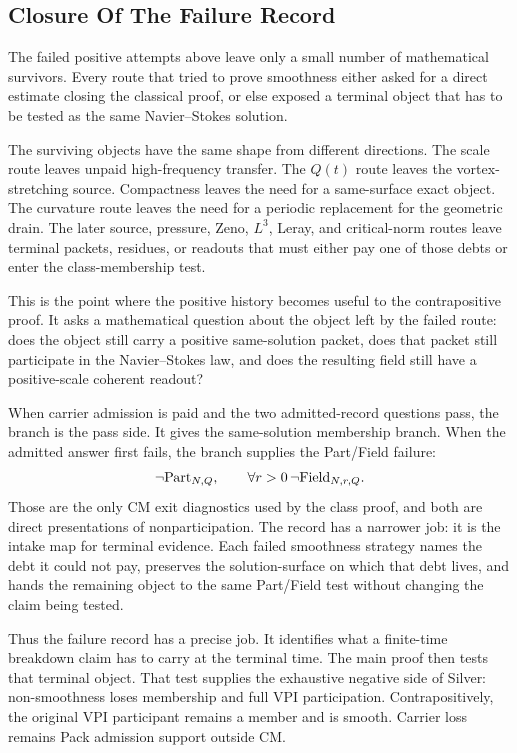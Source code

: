 \subsection{Closure Of The Failure Record}

The failed positive attempts above leave only a small number of mathematical
survivors.
Every route that tried to prove smoothness either asked for a direct estimate
closing the classical proof, or else exposed a terminal object that has to be
tested as the same Navier--Stokes solution.

The surviving objects have the same shape from different directions.
The scale route leaves unpaid high-frequency transfer.
The \(Q(t)\) route leaves the vortex-stretching source.
Compactness leaves the need for a same-surface exact object.
The curvature route leaves the need for a periodic replacement for the geometric
drain.
The later source, pressure, Zeno, \(L^3\), Leray, and critical-norm routes leave
terminal packets, residues, or readouts that must either pay one of those debts
or enter the class-membership test.

This is the point where the positive history becomes useful to the
contrapositive proof.
It asks a mathematical question about the object left by the failed route:
does the object still carry a positive same-solution packet, does that packet
still participate in the Navier--Stokes law, and does the resulting field still
have a positive-scale coherent readout?

When carrier admission is paid and the two admitted-record questions pass, the branch is the pass side.
It gives the same-solution membership branch.
When the admitted answer first fails, the branch supplies the Part/Field failure:
\[
  \neg\mathrm{Part}_{N,Q},
  \qquad
  \forall r>0\,\neg\mathrm{Field}_{N,r,Q}.
\]
Those are the only CM exit diagnostics used by the class proof, and both are
direct presentations of nonparticipation.
The record has a narrower job: it is the intake map for terminal evidence.
Each failed smoothness strategy
names the debt it could not pay, preserves the solution-surface on which that
debt lives, and hands the remaining object to the same Part/Field test
without changing the claim being tested.

Thus the failure record has a precise job.
It identifies what a finite-time breakdown claim has to carry at the terminal
time.
The main proof then tests that terminal object.
That test supplies the exhaustive negative side of Silver: non-smoothness
loses membership and full VPI participation.  Contrapositively, the original
VPI participant remains a member and is smooth.  Carrier loss remains Pack
admission support outside CM.
